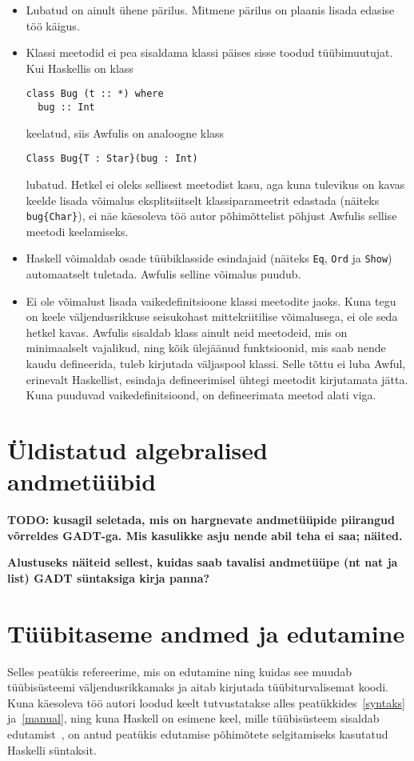 \documentclass[12pt]{article}
\newcommand\peatykk[1]{
  \clearpage
  \section{#1}}
\newcommand\markus[1]{\textcolor{roheline}{\textbf{#1}}}
\begin{document}
      \begin{itemize}
        \item
          Lubatud on ainult ühene pärilus. Mitmene pärilus on plaanis lisada edasise töö käigus.
        \item
          Klassi meetodid ei pea sisaldama klassi päises sisse toodud tüübimuutujat. Kui Haskellis on klass

          \begin{verbatim}class Bug (t :: *) where
  bug :: Int\end{verbatim}

          keelatud, siis Awfulis on analoogne klass

          \begin{verbatim}Class Bug{T : Star}(bug : Int)\end{verbatim}

          lubatud. Hetkel ei oleks sellisest meetodist kasu, aga kuna tulevikus on kavas keelde lisada võimalus eksplitsiitselt klassiparameetrit edastada (näiteks \verb!bug{Char}!), ei näe käesoleva töö autor põhimõttelist põhjust Awfulis sellise meetodi keelamiseks.
        \item
          Haskell võimaldab osade tüübiklasside esindajaid (näiteks \verb!Eq!, \verb!Ord! ja \verb!Show!) automaatselt tuletada. Awfulis selline võimalus puudub.
        \item
          Ei ole võimalust lisada vaikedefinitsioone klassi meetodite jaoks. Kuna tegu on keele väljendusrikkuse seisukohast mittekriitilise võimalusega, ei ole seda hetkel kavas. Awfulis sisaldab klass ainult neid meetodeid, mis on minimaalselt vajalikud, ning kõik ülejäänud funktsioonid, mis saab nende kaudu defineerida, tuleb kirjutada väljaspool klassi. Selle tõttu ei luba Awful, erinevalt Haskellist, esindaja defineerimisel ühtegi meetodit kirjutamata jätta. Kuna puuduvad vaikedefinitsioond, on defineerimata meetod alati viga.
      \end{itemize}
  \peatykk{Üldistatud algebralised andmetüübid}
    \markus{TODO: kusagil seletada, mis on hargnevate andmetüüpide piirangud võrreldes GADT-ga. Mis kasulikke asju nende abil teha ei saa; näited.}

    \markus{Alustuseks näiteid sellest, kuidas saab tavalisi andmetüüpe (nt nat ja list) GADT süntaksiga kirja panna?}
  \peatykk{Tüübitaseme andmed ja edutamine}\label{edutamine}
    Selles peatükis refereerime, mis on edutamine ning kuidas see muudab tüübisüsteemi väljendusrikkamaks ja aitab kirjutada tüübiturvalisemat koodi. Kuna käesoleva töö autori loodud keelt tutvustatakse alles peatükkides~\ref{syntaks} ja~\ref{manual}, ning kuna Haskell on esimene keel, mille tüübisüsteem sisaldab edutamist~\cite{Giv}, on antud peatükis edutamise põhimõtete selgitamiseks kasutatud Haskelli süntaksit.
\end{document}
